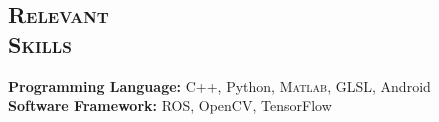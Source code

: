 \documentclass[margin, line, 10pt]{res} %
\begin{document}
\begin{resume}
\section{\textsc{Relevant\\Skills}}
\textbf{Programming Language:} C++, Python, \textsc{Matlab}, GLSL, Android\\
\textbf{Software Framework:} ROS, OpenCV, TensorFlow


\end{resume}
\end{document}
